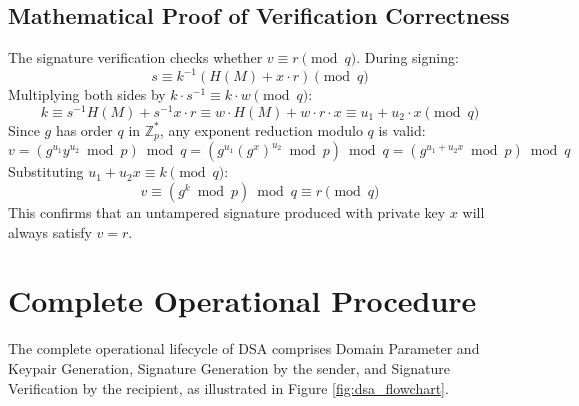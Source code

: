 \subsection{Mathematical Proof of Verification Correctness}
The signature verification checks whether $v \equiv r \pmod q$.
During signing:
\begin{equation}
s \equiv k^{-1} (H(M) + x \cdot r) \pmod q
\end{equation}
Multiplying both sides by $k \cdot s^{-1} \equiv k \cdot w \pmod q$:
\begin{equation}
k \equiv s^{-1} H(M) + s^{-1} x \cdot r \equiv w \cdot H(M) + w \cdot r \cdot x \equiv u_1 + u_2 \cdot x \pmod q
\end{equation}
Since $g$ has order $q$ in $\mathbb{Z}_p^*$, any exponent reduction modulo $q$ is valid:
\begin{equation}
v = (g^{u_1} y^{u_2} \bmod p) \bmod q = (g^{u_1} (g^x)^{u_2} \bmod p) \bmod q = (g^{u_1 + u_2 x} \bmod p) \bmod q
\end{equation}
Substituting $u_1 + u_2 x \equiv k \pmod q$:
\begin{equation}
v \equiv (g^k \bmod p) \bmod q \equiv r \pmod q
\end{equation}
This confirms that an untampered signature produced with private key $x$ will always satisfy $v = r$.

\section{Complete Operational Procedure}
The complete operational lifecycle of DSA comprises Domain Parameter and Keypair Generation, Signature Generation by the sender, and Signature Verification by the recipient, as illustrated in Figure \ref{fig:dsa_flowchart}.

